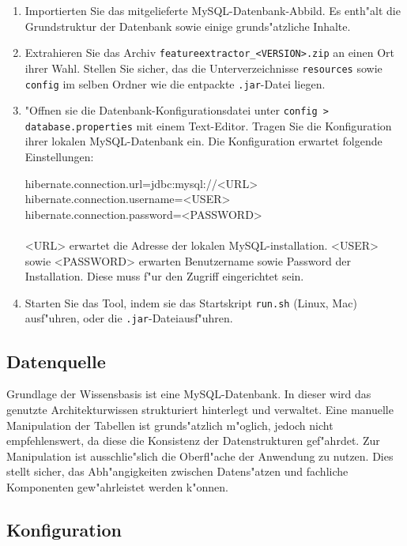 \documentclass{proc}
\begin{document}
	\begin{enumerate}
		\item Importierten Sie das mitgelieferte MySQL-Datenbank-Abbild.
		Es enth"alt die Grundstruktur der Datenbank sowie einige grunds"atzliche Inhalte.
		\item Extrahieren Sie das Archiv \texttt{featureextractor\_\textless{VERSION}\textgreater.zip}  an einen Ort ihrer Wahl.
		Stellen Sie sicher, das die Unterverzeichnisse \texttt{resources} sowie \texttt{config} im selben Ordner wie die entpackte \texttt{.jar}-Datei liegen.
		\item "Offnen sie die Datenbank-Konfigurationsdatei unter \texttt{config > database.properties} mit einem Text-Editor.
		Tragen Sie die Konfiguration ihrer lokalen MySQL-Datenbank ein.
		Die Konfiguration erwartet folgende Einstellungen:
		
		hibernate.connection.url=jdbc:mysql://\textless{URL}\textgreater\\
		hibernate.connection.username=\textless{USER}\textgreater\\
		hibernate.connection.password=\textless{PASSWORD}\textgreater\\
		\\
		\textless{URL}\textgreater{ } erwartet die Adresse der lokalen MySQL-installation. \textless{USER}\textgreater{ } sowie
		\textless{PASSWORD}\textgreater{ } erwarten Benutzername sowie Password der Installation.
		Diese muss f"ur den Zugriff eingerichtet sein.	
		\item Starten Sie das Tool, indem sie das Startskript \texttt{run.sh} (Linux, Mac) ausf"uhren, oder die \texttt{.jar}-Dateiausf"uhren.
	\end{enumerate}
	
	\subsection{Datenquelle}
	
	Grundlage der Wissensbasis ist eine MySQL-Datenbank.
	In dieser wird das genutzte Architekturwissen strukturiert hinterlegt und verwaltet.
	Eine manuelle Manipulation der Tabellen ist grunds"atzlich m"oglich, jedoch nicht empfehlenswert, da diese die Konsistenz der Datenstrukturen gef"ahrdet.
	Zur Manipulation ist ausschlie"slich die Oberfl"ache der Anwendung zu nutzen.
	Dies stellt sicher, das Abh"angigkeiten zwischen Datens"atzen und fachliche Komponenten gew"ahrleistet werden k"onnen.
	
	\subsection{Konfiguration}
	
\end{document}
